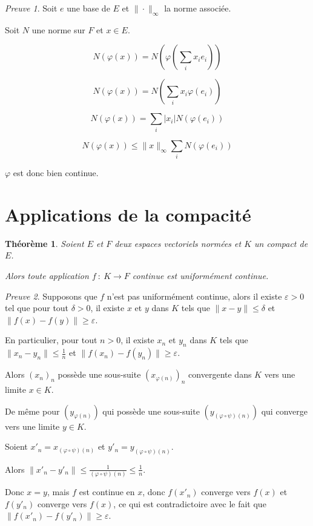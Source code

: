 \documentclass[]{article}
\newtheorem{mythm}{Théorème}
\theoremstyle{remark}
\newtheorem{myproof}{Preuve}
\theoremstyle{definition}
\newcommand{\funcshort}[3]{
#1 ~ : ~ #2 \longrightarrow #3
}
\begin{document}
\begin{myproof}
	Soit $e$ une base de $E$ et $\|\cdot\|_{\infty}$ la norme associée.
	
	Soit $N$ une norme sur $F$ et $x \in E$.
	
	$$N(\varphi(x))=N\left(\varphi \left(\sum_{i} x_i e_i\right)\right)$$

	$$N(\varphi(x))=N\left(\sum_{i} x_i \varphi \left(e_i\right)\right)$$
	
	$$N(\varphi(x))= \sum_{i} |x_i| N\left(\varphi \left(e_i\right)\right)$$
	
	$$N(\varphi(x)) \leqslant \|x\|_{\infty} \sum_i N(\varphi (e_i))$$
	
	$\varphi$ est donc bien continue.
\end{myproof}

\section{Applications de la compacité}

\begin{mythm}
	Soient $E$ et $F$ deux espaces vectoriels normées et $K$ un compact de $E$.
	
	Alors toute application $\funcshort{f}{K}{F}$ continue est uniformément continue.
\end{mythm}

\begin{myproof}
	Supposons que $f$ n'est pas uniformément continue, alors il existe $\varepsilon > 0$ tel que pour tout $\delta > 0$, il existe $x$ et $y$ dans $K$ tels que $\|x-y\| \leqslant \delta$ et $\|f(x) - f(y)\| \geqslant \varepsilon$.
	
	En particulier, pour tout $n > 0$, il existe $x_n$ et $y_n$ dans $K$ tels que $\|x_n-y_n\| \leqslant \frac{1}{n}$ et $\|f(x_n) - f(y_n)\| \geqslant \varepsilon$.
	
	Alors $(x_n)_n$ possède une sous-suite $(x_{\varphi(n)})_n$ convergente dans $K$ vers une limite $x \in K$.
	
	De même pour $(y_{\varphi(n)})$ qui possède une sous-suite $(y_{(\varphi \circ \psi)(n)})$ qui converge vers une limite $y \in K$.
	
	Soient $x'_n = x_{(\varphi \circ \psi)(n)}$ et $y'_n = y_{(\varphi \circ \psi)(n)}$.
	
	Alors $\|x'_n - y'_n\| \leqslant \frac{1}{(\varphi \circ \psi)(n)} \leqslant \frac{1}{n}$.
	
	Donc $x=y$, mais $f$ est continue en $x$, donc $f(x'_n)$ converge vers $f(x)$ et $f(y'_n)$ converge vers $f(x)$, ce qui est contradictoire avec le fait que $\|f(x'_n) - f(y'_n)\| \geqslant \varepsilon$.
\end{myproof}
\end{document}
